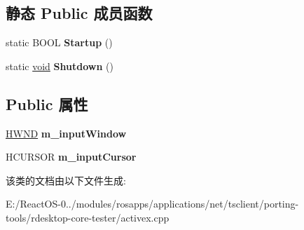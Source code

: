 \subsection*{静态 Public 成员函数}
\begin{DoxyCompactItemize}
\item 
\mbox{\label{class_rdp_client_u_i_a33b08816c91c2ced30eeae2e3cfcf0d2}} 
static B\+O\+OL {\bfseries Startup} ()
\item 
\mbox{\label{class_rdp_client_u_i_af8676f184b45e1f257375a589a75d18f}} 
static \hyperlink{interfacevoid}{void} {\bfseries Shutdown} ()
\end{DoxyCompactItemize}
\subsection*{Public 属性}
\begin{DoxyCompactItemize}
\item 
\mbox{\label{class_rdp_client_u_i_ac9f112cfbaa4779cb617003b15f1126f}} 
\hyperlink{interfacevoid}{H\+W\+ND} {\bfseries m\+\_\+input\+Window}
\item 
\mbox{\label{class_rdp_client_u_i_ad49e8656cc355b4091cbdb9f2fbcb931}} 
H\+C\+U\+R\+S\+OR {\bfseries m\+\_\+input\+Cursor}
\end{DoxyCompactItemize}


该类的文档由以下文件生成\+:\begin{DoxyCompactItemize}
\item 
E\+:/\+React\+O\+S-\/0../modules/rosapps/applications/net/tsclient/porting-\/tools/rdesktop-\/core-\/tester/activex.\+cpp\end{DoxyCompactItemize}
